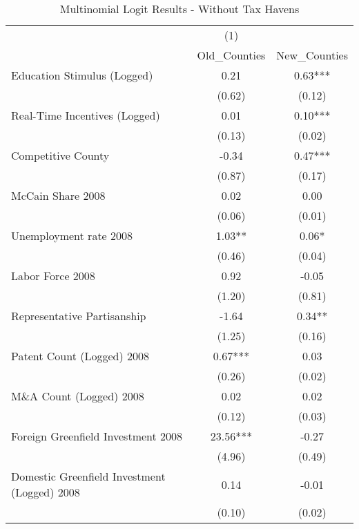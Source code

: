 \begin{table}[!htbp]\centering
\def\sym#1{\ifmmode^{#1}\else\(^{#1}\)\fi}
\caption{Multinomial Logit Results - Without Tax Havens}
\begin{tabular}{l*{2}{c}}
\hline\hline
                    &         (1)   &               \\
                    &Old_Counties   &New_Counties   \\
\hline
Education Stimulus (Logged)&        0.21   &        0.63***\\
                    &      (0.62)   &      (0.12)   \\
Real-Time Incentives (Logged)&        0.01   &        0.10***\\
                    &      (0.13)   &      (0.02)   \\
Competitive County  &       -0.34   &        0.47***\\
                    &      (0.87)   &      (0.17)   \\
McCain Share 2008   &        0.02   &        0.00   \\
                    &      (0.06)   &      (0.01)   \\
Unemployment rate 2008&        1.03** &        0.06*  \\
                    &      (0.46)   &      (0.04)   \\
Labor Force 2008    &        0.92   &       -0.05   \\
                    &      (1.20)   &      (0.81)   \\
Representative Partisanship&       -1.64   &        0.34** \\
                    &      (1.25)   &      (0.16)   \\
Patent Count (Logged) 2008&        0.67***&        0.03   \\
                    &      (0.26)   &      (0.02)   \\
M\&A Count (Logged) 2008&        0.02   &        0.02   \\
                    &      (0.12)   &      (0.03)   \\
Foreign Greenfield Investment 2008&       23.56***&       -0.27   \\
                    &      (4.96)   &      (0.49)   \\
Domestic Greenfield Investment (Logged) 2008&        0.14   &       -0.01   \\
                    &      (0.10)   &      (0.02)   \\

\end{tabular}
\end{table}
